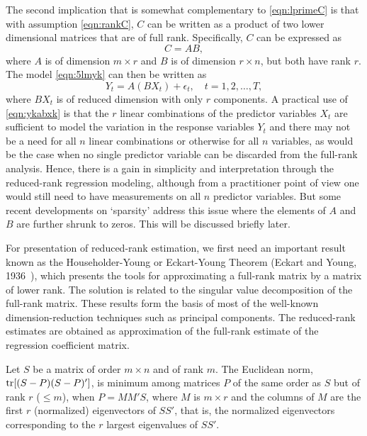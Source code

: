 The second implication that is somewhat complementary to \eqref{eqn:lprimeC} is that with assumption \eqref{eqn:rankC}, $C$ can be written as a product of two lower dimensional matrices that are of full rank. Specifically, $C$ can be expressed as
	\begin{equation} \label{eqn:Ceqab}
	C= AB,
	\end{equation}
where $A$ is of dimension $m \times r$ and $B$ is of dimension $r \times n$, but both have rank $r$. The model \eqref{eqn:5lmyk} can then be written as
	\begin{equation} \label{eqn:ykabxk}
	Y_t= A(BX_t) + \epsilon_t, \quad t= 1, 2, \ldots, T,
	\end{equation}
where $BX_t$ is of reduced dimension with only $r$ components. A practical use of \eqref{eqn:ykabxk} is that the $r$ linear combinations of the predictor variables $X_t$ are sufficient to model the variation in the response variables $Y_t$ and there may not be a need for all $n$ linear combinations or otherwise for all $n$ variables, as would be the case when no single predictor variable can be discarded from the full-rank analysis. Hence, there is a gain in simplicity and interpretation through the reduced-rank regression modeling, although from a practitioner point of view one would still need to have measurements on all $n$ predictor variables. But some recent developments on `sparsity' address this issue where the elements of $A$ and $B$ are further shrunk to zeros. This will be discussed briefly later.


For presentation of reduced-rank estimation, we first need an important result known as the Householder-Young or Eckart-Young Theorem (Eckart and Young, 1936~\cite{eckyoung}), which presents the tools for approximating a full-rank matrix by a matrix of lower rank. The solution is related to the singular value decomposition of the full-rank matrix. These results form the basis of most of the well-known dimension-reduction techniques such as principal components. The reduced-rank estimates are obtained as approximation of the full-rank estimate of the regression coefficient matrix. 


\begin{result} \label{res:3} 
Let $S$ be a matrix of order $m \times n$ and of rank $m$. The Euclidean norm, $\operatorname{tr}[(S-P)(S-P)']$, is minimum among matrices $P$ of the same order  as $S$ but of rank $r$ ($\leq m$), when $P= MM'S$, where $M$ is $m \times r$ and the columns of $M$ are the first $r$ (normalized) eigenvectors of $SS'$, that is, the normalized eigenvectors corresponding to the $r$ largest eigenvalues of $SS'$. 
\end{result}


